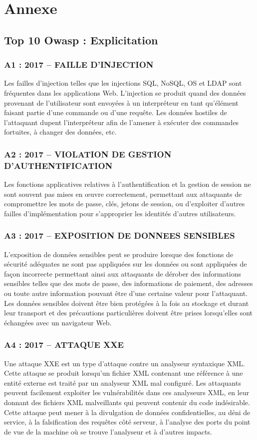\chapter*{Annexe}
\minitoc
\clearpage
%

\section*{Top 10 Owasp : Explicitation}
\subsection*{A1 : 2017 – FAILLE D’INJECTION}
Les failles d’injection telles que les injections SQL, NoSQL, OS et LDAP sont fréquentes dans les applications Web. L'injection se produit quand des données provenant de l'utilisateur sont envoyées à un interpréteur en tant qu'élément faisant partie d'une commande ou d'une requête. Les données hostiles de l'attaquant dupent l'interpréteur afin de l'amener à exécuter des commandes fortuites, à changer des données, etc.

\subsection*{A2 : 2017 – VIOLATION DE GESTION D’AUTHENTIFICATION}
Les fonctions applicatives relatives à l'authentification et la gestion de session ne sont souvent pas mises en œuvre correctement, permettant aux attaquants de compromettre les mots de passe, clés, jetons de session, ou d'exploiter d'autres failles d'implémentation pour s'approprier les identités d'autres utilisateurs.
\subsection*{A3 : 2017 – EXPOSITION DE DONNEES SENSIBLES}
L’exposition de données sensibles peut se produire lorsque des fonctions de sécurité adéquates ne sont pas appliquées sur les données ou sont appliquées de façon incorrecte permettant ainsi  aux attaquants de dérober des informations sensibles telles que des mots de passe, des informations de paiement, des adresses ou toute autre information pouvant être d’une certaine valeur pour l’attaquant. Les données sensibles doivent être bien protégées à la fois au stockage et durant leur transport et des précautions particulières doivent être prises lorsqu’elles sont échangées avec un navigateur Web.
\subsection*{A4 : 2017 – ATTAQUE XXE}
Une attaque XXE est un type d’attaque contre un analyseur syntaxique XML. Cette attaque se produit lorsqu’un fichier XML contenant une référence à une entité externe est traité par un analyseur XML mal configuré. Les attaquants peuvent facilement exploiter les vulnérabilités dans ces analyseurs XML, en leur donnant des fichiers XML malveillants qui peuvent contenir du code indésirable. Cette attaque peut mener à la divulgation de données confidentielles, au déni de service, à la falsification des requêtes côté serveur, à l'analyse des ports du point de vue de la machine où se trouve l'analyseur et à d'autres impacts.
